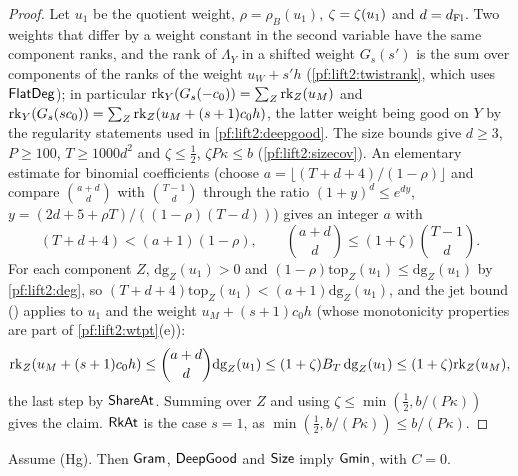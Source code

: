 \begin{proof}
Let $u_1$ be the quotient weight, $\rho=\rho_B(u_1)$, $\zeta=\zeta(u_1)$ and $d=d_{\mathrm{Fl}}$. Two weights that differ
by a weight constant in the second variable have the same component ranks, and the rank of $\Lambda_Y$ in a shifted
weight $G_s(s')$ is the sum over components of the ranks of the weight $u_W+s'h$
(\cref{pf:lift2:twistrank}, which uses $\mathsf{FlatDeg}$); in particular
$\operatorname{rk}_Y(G_s(-c_0))=\sum_Z\mathrm{rk}_Z(u_M)$ and $\operatorname{rk}_Y(G_s(sc_0))=\sum_Z\mathrm{rk}_Z(u_M+(s+1)c_0h)$, the
latter weight being good on $Y$ by the regularity statements used in \cref{pf:lift2:deepgood}. The size bounds give
$d\ge3$, $P\ge100$, $T\ge1000d^2$ and $\zeta\le\frac12$, $\zeta P\kappa\le b$
(\cref{pf:lift2:sizecov}). An elementary estimate for binomial coefficients
(choose $a=\lfloor(T+d+4)/(1-\rho)\rfloor$ and compare $\binom{a+d}d$ with $\binom{T-1}d$ through the ratio
$(1+y)^d\le e^{dy}$, $y=(2d+5+\rho T)/((1-\rho)(T-d))$) gives an integer $a$ with
\[
(T+d+4)<(a+1)(1-\rho),\qquad\binom{a+d}d\le(1+\zeta)\binom{T-1}d.
\]
For each component $Z$, $\mathrm{dg}_Z(u_1)>0$ and $(1-\rho)\mathrm{top}_Z(u_1)\le\mathrm{dg}_Z(u_1)$ by
\cref{pf:lift2:deg}, so $(T+d+4)\mathrm{top}_Z(u_1)<(a+1)\mathrm{dg}_Z(u_1)$, and the jet bound
() applies to $u_1$ and the weight $u_M+(s+1)c_0h$ (whose monotonicity
properties are part of \cref{pf:lift2:wtpt}(e)):
\[
\mathrm{rk}_Z(u_M+(s+1)c_0h)\le\binom{a+d}d\mathrm{dg}_Z(u_1)\le(1+\zeta)B_T\,\mathrm{dg}_Z(u_1)
\le(1+\zeta)\mathrm{rk}_Z(u_M),
\]
the last step by $\mathsf{ShareAt}$. Summing over $Z$ and using $\zeta\le\min(\frac12,b/(P\kappa))$ gives the claim.
$\mathsf{RkAt}$ is the case $s=1$, as $\min(\frac12,b/(P\kappa))\le b/(P\kappa)$.
\end{proof}

\begin{proposition}\label{pf:lift2:gmin}
Assume \textup{(Hg)}. Then $\mathsf{Gram}$, $\mathsf{DeepGood}$ and $\mathsf{Size}$ imply $\mathsf{Gmin}$, with $C=0$.
\end{proposition}

